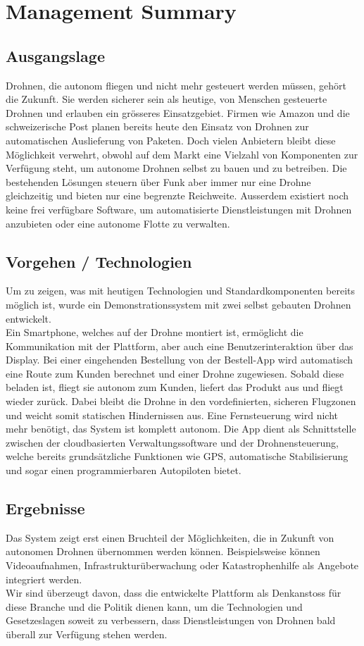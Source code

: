 \newpage
\cleardoublepage
{}
{}
\chapter*{Management Summary}
\section*{Ausgangslage}
Drohnen, die autonom fliegen und nicht mehr gesteuert werden müssen, gehört die Zukunft. Sie werden sicherer sein als heutige, von Menschen gesteuerte Drohnen und erlauben ein grösseres Einsatzgebiet. Firmen wie Amazon und die schweizerische Post planen bereits heute den Einsatz von Drohnen zur automatischen Auslieferung von Paketen. Doch vielen Anbietern bleibt diese Möglichkeit verwehrt, obwohl auf dem Markt eine Vielzahl von Komponenten zur Verfügung steht, um autonome Drohnen selbst zu bauen und zu betreiben. Die bestehenden Lösungen steuern über Funk aber immer nur eine Drohne gleichzeitig und bieten nur eine begrenzte Reichweite. Ausserdem existiert noch keine frei verfügbare Software, um automatisierte Dienstleistungen mit Drohnen anzubieten oder eine autonome Flotte zu verwalten.

\section*{Vorgehen / Technologien}
Um zu zeigen, was mit heutigen Technologien und Standardkomponenten bereits möglich ist, wurde ein Demonstrationssystem mit zwei selbst gebauten Drohnen entwickelt. \\

Ein Smartphone, welches auf der Drohne montiert ist, ermöglicht die Kommunikation mit der Plattform, aber auch eine Benutzerinteraktion über das Display. Bei einer eingehenden Bestellung von der Bestell-App wird automatisch eine Route zum Kunden berechnet und einer Drohne zugewiesen. Sobald diese beladen ist, fliegt sie autonom zum Kunden, liefert das Produkt aus und fliegt wieder zurück. Dabei bleibt die Drohne in den vordefinierten, sicheren Flugzonen und weicht somit statischen Hindernissen aus. Eine Fernsteuerung wird nicht mehr benötigt, das System ist komplett autonom. Die App dient als Schnittstelle zwischen der cloudbasierten Verwaltungssoftware und der Drohnensteuerung, welche bereits grundsätzliche Funktionen wie GPS, automatische Stabilisierung und sogar einen programmierbaren Autopiloten bietet.

\section*{Ergebnisse}
Das System zeigt erst einen Bruchteil der Möglichkeiten, die in Zukunft von autonomen Drohnen übernommen werden können. Beispielsweise können Videoaufnahmen, Infrastrukturüberwachung oder Katastrophenhilfe als Angebote integriert werden. \\

Wir sind überzeugt davon, dass die entwickelte Plattform als Denkanstoss für diese Branche und die Politik dienen kann, um die Technologien und Gesetzeslagen soweit zu verbessern, dass Dienstleistungen von Drohnen bald überall zur Verfügung stehen werden.
